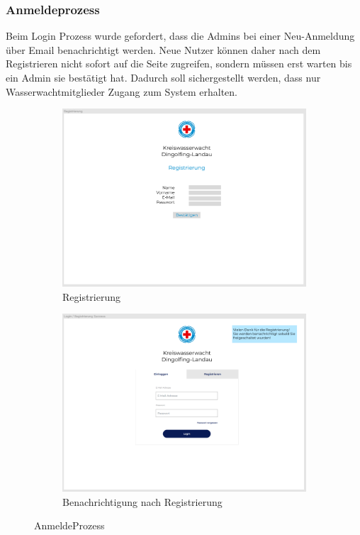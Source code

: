 \documentclass[fontsize=12pt,openright,oneside,paper=a4,BCOR=1cm]{scrbook}
\begin{document}
\subsubsection{Anmeldeprozess}

Beim Login Prozess wurde gefordert, dass die \glqq Admins\grqq{} bei einer Neu-Anmeldung über Email benachrichtigt werden. Neue Nutzer können daher nach dem Registrieren nicht sofort auf die Seite zugreifen, sondern müssen erst warten bis ein Admin sie bestätigt hat. Dadurch soll sichergestellt werden, dass nur Wasserwachtmitglieder Zugang zum System erhalten.\\

\begin{figure}[H]
  \centering
  \begin{subfigure}[b]{0.4\linewidth}
    \includegraphics[width=\linewidth]{Anlagen/Figma/2-Registrierung.png}
    \caption{Registrierung}
  \end{subfigure}
  \begin{subfigure}[b]{0.4\linewidth}
    \includegraphics[width=\linewidth]{Anlagen/Figma/3-LoginSuccess.png}
    \caption{Benachrichtigung nach Registrierung}
  \end{subfigure}
  \caption{AnmeldeProzess}
  \label{fig:anmeldeprozess}
\end{figure}
\end{document}
